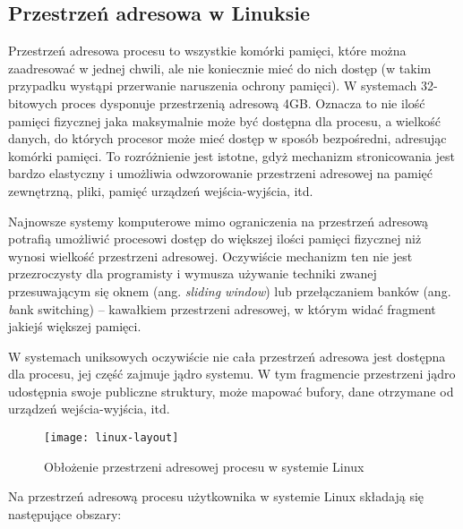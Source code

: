 \documentclass[12pt,a4paper,titlepage,twoside]{mwart}
\begin{document}
\subsection{Przestrzeń adresowa w Linuksie}

Przestrzeń adresowa procesu to wszystkie komórki pamięci, które można
zaadresować w jednej chwili, ale nie koniecznie mieć do nich dostęp (w takim
przypadku wystąpi przerwanie naruszenia ochrony pamięci). W systemach
32-bitowych proces dysponuje przestrzenią adresową 4GB. Oznacza to nie ilość
pamięci fizycznej jaka maksymalnie może być dostępna dla procesu, a wielkość
danych, do których procesor może mieć dostęp w sposób bezpośredni, adresując
komórki pamięci. To rozróżnienie jest istotne, gdyż mechanizm stronicowania
jest bardzo elastyczny i umożliwia odwzorowanie przestrzeni adresowej na pamięć
zewnętrzną, pliki, pamięć urządzeń wejścia-wyjścia, itd.

Najnowsze systemy komputerowe mimo ograniczenia na przestrzeń adresową potrafią
umożliwić procesowi dostęp do większej ilości pamięci fizycznej niż wynosi
wielkość przestrzeni adresowej. Oczywiście mechanizm ten nie jest przezroczysty
dla programisty i wymusza używanie techniki zwanej przesuwającym się oknem
(ang. \textit{sliding window}) lub przełączaniem banków (ang. \textit bank
switching) -- kawałkiem przestrzeni adresowej, w którym widać fragment jakiejś
większej pamięci.

W systemach uniksowych oczywiście nie cała przestrzeń adresowa jest dostępna
dla procesu, jej część zajmuje jądro systemu. W tym fragmencie przestrzeni
jądro udostępnia swoje publiczne struktury, może mapować bufory, dane otrzymane
od urządzeń wejścia-wyjścia, itd.

\begin{figure}[h]
\centering
\texttt{[image: linux-layout]}
\caption{Obłożenie przestrzeni adresowej procesu w systemie Linux}
\end{figure}

Na przestrzeń adresową procesu użytkownika w systemie Linux składają się
następujące obszary:
\end{document}
